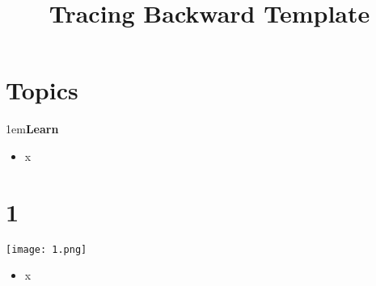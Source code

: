 \documentclass[10pt]{beamer}
\title{Tracing Backward Template}
\date{}
\begin{document}
\maketitle

\section{Topics}
\begin{frame}
\leftskip1em\textbf{Learn}
	\begin{itemize}
		\item x
	\end{itemize}
\end{frame}

\section{1}
\begin{frame}
	\begin{center}
			\texttt{[image: 1.png]}
	\end{center}
	\begin{itemize}
		\item x
	\end{itemize}
\end{frame}
\end{document}
